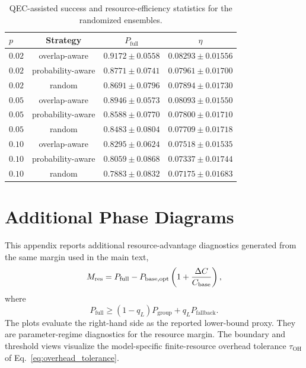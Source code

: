 \documentclass[
 reprint,
 amsmath,amssymb,
 aps,
 pra,
 floatfix,
]{revtex4-2}
\begin{document}
\begin{table}[!htb]
\caption{\label{tab:appendix_reliability_eta_stats}QEC-assisted success and resource-efficiency statistics for the randomized ensembles.}
\begin{ruledtabular}
\begin{tabular}{lccc}
$p$ & Strategy & $P_{\mathrm{full}}$ & $\eta$\\
\hline
$0.02$ & overlap-aware & $0.9172\pm0.0558$ & $0.08293\pm0.01556$\\
$0.02$ & probability-aware & $0.8771\pm0.0741$ & $0.07961\pm0.01700$\\
$0.02$ & random & $0.8691\pm0.0796$ & $0.07894\pm0.01730$\\
$0.05$ & overlap-aware & $0.8946\pm0.0573$ & $0.08093\pm0.01550$\\
$0.05$ & probability-aware & $0.8588\pm0.0770$ & $0.07800\pm0.01710$\\
$0.05$ & random & $0.8483\pm0.0804$ & $0.07709\pm0.01718$\\
$0.10$ & overlap-aware & $0.8295\pm0.0624$ & $0.07518\pm0.01535$\\
$0.10$ & probability-aware & $0.8059\pm0.0868$ & $0.07337\pm0.01744$\\
$0.10$ & random & $0.7883\pm0.0832$ & $0.07175\pm0.01683$\\
\end{tabular}
\end{ruledtabular}
\end{table}

\FloatBarrier
\section{Additional Phase Diagrams}
\label{app:additional_phase}

This appendix reports additional resource-advantage diagnostics generated from the same margin used in the main text,
\begin{equation}
    M_{\rm res}
    =
    P_{\mathrm{full}}
    -
    P_{\mathrm{base,opt}}
    \left(1+\frac{\Delta C}{C_{\mathrm{base}}}\right),
\end{equation}
where
\begin{equation}
    P_{\mathrm{full}}
    \geq
    (1-q_L)P_{\mathrm{group}}+q_LP_{\mathrm{fallback}}.
\end{equation}
The plots evaluate the right-hand side as the reported lower-bound proxy. They are parameter-regime diagnostics for the resource margin. The boundary and threshold views visualize the model-specific finite-resource overhead tolerance \(\tau_{\mathrm{OH}}\) of Eq.~\eqref{eq:overhead_tolerance}.
\end{document}
